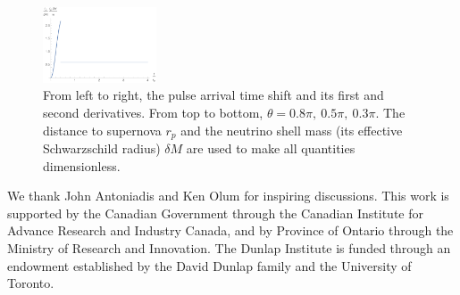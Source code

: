 \documentclass[aps,showpacs,onecolumn,floats,prd,superscriptaddress,nofootinbib]{revtex4}
\begin{document}
\begin{figure}[t]
\includegraphics[width=0.3\textwidth]{3a}
\caption{From left to right, the pulse arrival time shift and its first and second derivatives. From top to bottom, $\theta=0.8\pi, \ 0.5\pi, \ 0.3\pi$. The distance to supernova $r_p$ and the neutrino shell mass (its effective Schwarzschild radius) $\delta M$ are used to make all quantities dimensionless.}
\label{fig-3x3}
\end{figure}

\acknowledgments

We thank John Antoniadis and Ken Olum for inspiring discussions. This work is supported by the Canadian Government through the Canadian Institute for Advance Research and Industry Canada, and by Province of Ontario through the Ministry of Research and Innovation. The Dunlap Institute is funded through an endowment established by the David Dunlap family and the University of Toronto.

\appendix

%

\end{document}
